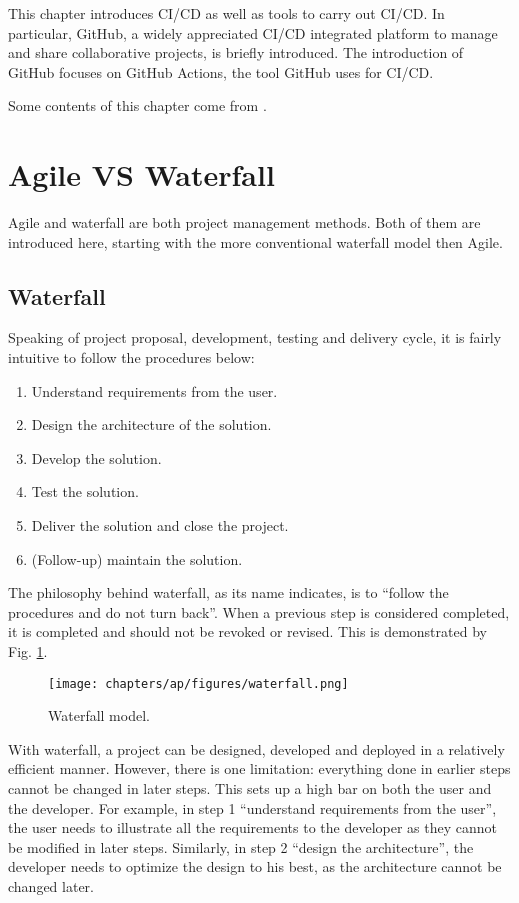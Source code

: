 This chapter introduces CI/CD as well as tools to carry out CI/CD. In particular, GitHub, a widely appreciated CI/CD integrated platform to manage and share collaborative projects, is briefly introduced. The introduction of GitHub focuses on GitHub Actions, the tool GitHub uses for CI/CD.

Some contents of this chapter come from \cite{honai2023cicd}.

\section{Agile VS Waterfall}

Agile and waterfall are both project management methods. Both of them are introduced here, starting with the more conventional waterfall model then Agile.

\subsection{Waterfall}

Speaking of project proposal, development, testing and delivery cycle, it is fairly intuitive to follow the procedures below:
\begin{enumerate}
	\item Understand requirements from the user.
	\item Design the architecture of the solution.
	\item Develop the solution.
	\item Test the solution.
	\item Deliver the solution and close the project.
	\item (Follow-up) maintain the solution.
\end{enumerate}
The philosophy behind waterfall, as its name indicates, is to ``follow the procedures and do not turn back''. When a previous step is considered completed, it is completed and should not be revoked or revised. This is demonstrated by Fig. \ref{ch:cicd:fig:waterfall}.
\begin{figure}[htbp]
	\centering
	\texttt{[image: chapters/ap/figures/waterfall.png]}
	\caption{Waterfall model.} \label{ch:cicd:fig:waterfall}
\end{figure}

With waterfall, a project can be designed, developed and deployed in a relatively efficient manner. However, there is one limitation: everything done in earlier steps cannot be changed in later steps. This sets up a high bar on both the user and the developer. For example, in step 1 ``understand requirements from the user'', the user needs to illustrate all the requirements to the developer as they cannot be modified in later steps. Similarly, in step 2 ``design the architecture'', the developer needs to optimize the design to his best, as the architecture cannot be changed later.

